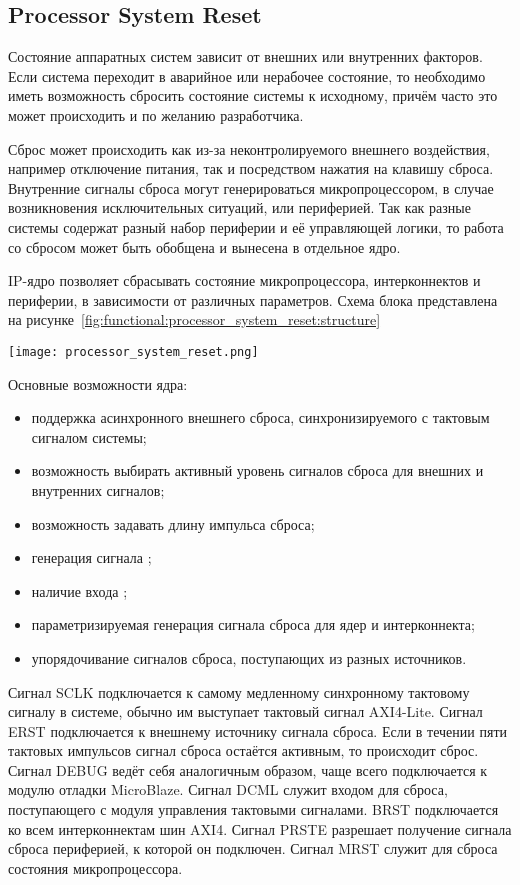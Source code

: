 \subsection{Processor System Reset}
\label{sec:functional:processor_system_reset}

Состояние аппаратных систем зависит от внешних или внутренних факторов. Если система переходит в
аварийное или нерабочее состояние, то необходимо иметь возможность сбросить состояние системы к
исходному, причём часто это может происходить и по желанию разработчика.

Сброс может происходить как из-за неконтролируемого внешнего воздействия, например отключение
питания, так и посредством нажатия на клавишу сброса. Внутренние сигналы сброса могут генерироваться
микропроцессором, в случае возникновения исключительных ситуаций, или периферией. Так как
разные системы содержат разный набор периферии и её управляющей логики, то работа со сбросом
может быть обобщена и вынесена в отдельное ядро.

IP-ядро  позволяет сбрасывать состояние микропроцессора, интерконнектов
и периферии, в зависимости от различных параметров. Схема блока представлена на рисунке~\ref{fig:functional:processor_system_reset:structure}

\begin{center}
  \centering
  \texttt{[image: processor\_system\_reset.png]}
  \label{fig:functional:processor_system_reset:structure}
\end{center}

Основные возможности ядра:
\begin{itemize}
  \item поддержка асинхронного внешнего сброса, синхронизируемого с тактовым сигналом системы;
  \item возможность выбирать активный уровень сигналов сброса для внешних и внутренних сигналов;
  \item возможность задавать длину импульса сброса;
  \item генерация сигнала ;
  \item наличие входа ;
  \item параметризируемая генерация сигнала сброса для ядер и интерконнекта;
  \item упорядочивание сигналов сброса, поступающих из разных источников.
\end{itemize}

Сигнал SCLK подключается к самому медленному синхронному тактовому сигналу в системе,
обычно им выступает тактовый сигнал AXI4-Lite. Сигнал ERST подключается к
внешнему источнику сигнала сброса. Если в течении пяти тактовых импульсов сигнал
сброса остаётся активным, то происходит сброс. Сигнал DEBUG ведёт себя аналогичным образом,
чаще всего подключается к модулю отладки MicroBlaze. Сигнал DCML служит входом для сброса,
поступающего с модуля управления тактовыми сигналами. BRST подключается ко всем интерконнектам
шин AXI4. Сигнал PRSTE разрешает получение сигнала сброса периферией, к которой он подключен.
Сигнал MRST служит для сброса состояния микропроцессора.

